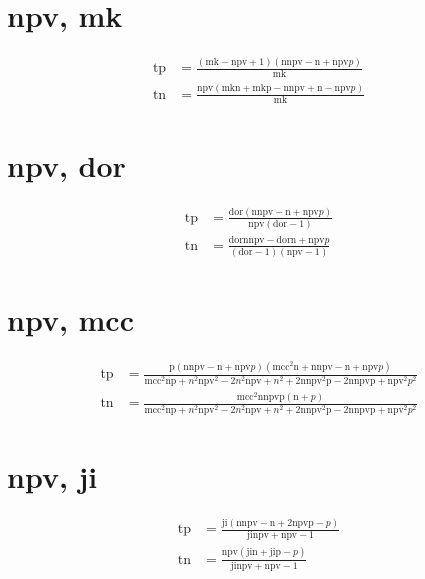 \documentclass[3p,times]{elsarticle}
\begin{document}
\begin{footnotesize}
\begin{landscape}
\section{npv, mk}
\begin{align}
\mathrm{tp} &= \frac{\left(\mathrm{mk} - \mathrm{npv} + 1\right) \left(\mathrm{n} \mathrm{npv} - \mathrm{n} + \mathrm{npv} p\right)}{\mathrm{mk}}\\
\mathrm{tn} &= \frac{\mathrm{npv} \left(\mathrm{mk} \mathrm{n} + \mathrm{mk} \mathrm{p} - \mathrm{n} \mathrm{npv} + \mathrm{n} - \mathrm{npv} p\right)}{\mathrm{mk}}
\end{align}
\section{npv, dor}
\begin{align}
\mathrm{tp} &= \frac{\mathrm{dor} \left(\mathrm{n} \mathrm{npv} - \mathrm{n} + \mathrm{npv} p\right)}{\mathrm{npv} \left(\mathrm{dor} - 1\right)}\\
\mathrm{tn} &= \frac{\mathrm{dor} \mathrm{n} \mathrm{npv} - \mathrm{dor} \mathrm{n} + \mathrm{npv} p}{\left(\mathrm{dor} - 1\right) \left(\mathrm{npv} - 1\right)}
\end{align}
\section{npv, mcc}
\begin{align}
\mathrm{tp} &= \frac{\mathrm{p} \left(\mathrm{n} \mathrm{npv} - \mathrm{n} + \mathrm{npv} p\right) \left(\mathrm{mcc}^{2} \mathrm{n} + \mathrm{n} \mathrm{npv} - \mathrm{n} + \mathrm{npv} p\right)}{\mathrm{mcc}^{2} \mathrm{n} \mathrm{p} + n^{2} \mathrm{npv}^{2} - 2 n^{2} \mathrm{npv} + n^{2} + 2 \mathrm{n} \mathrm{npv}^{2} \mathrm{p} - 2 \mathrm{n} \mathrm{npv} \mathrm{p} + \mathrm{npv}^{2} p^{2}}\\
\mathrm{tn} &= \frac{\mathrm{mcc}^{2} \mathrm{n} \mathrm{npv} \mathrm{p} \left(\mathrm{n} + p\right)}{\mathrm{mcc}^{2} \mathrm{n} \mathrm{p} + n^{2} \mathrm{npv}^{2} - 2 n^{2} \mathrm{npv} + n^{2} + 2 \mathrm{n} \mathrm{npv}^{2} \mathrm{p} - 2 \mathrm{n} \mathrm{npv} \mathrm{p} + \mathrm{npv}^{2} p^{2}}
\end{align}
\section{npv, ji}
\begin{align}
\mathrm{tp} &= \frac{\mathrm{ji} \left(\mathrm{n} \mathrm{npv} - \mathrm{n} + 2 \mathrm{npv} \mathrm{p} - p\right)}{\mathrm{ji} \mathrm{npv} + \mathrm{npv} - 1}\\
\mathrm{tn} &= \frac{\mathrm{npv} \left(\mathrm{ji} \mathrm{n} + \mathrm{ji} \mathrm{p} - p\right)}{\mathrm{ji} \mathrm{npv} + \mathrm{npv} - 1}
\end{align}

\end{landscape}
\end{footnotesize}
\end{document}
